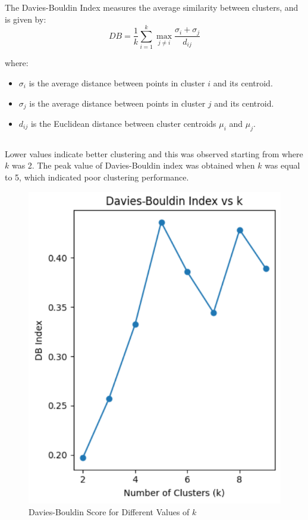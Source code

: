 \documentclass[conference]{IEEEtran}
\begin{document}
The Davies-Bouldin Index measures the average similarity between clusters, and is given by:
\begin{equation}
DB = \frac{1}{k} \sum_{i=1}^{k} \max_{j \neq i} \frac{\sigma_i + \sigma_j}{d_{ij}}
\end{equation}

where:
\begin{itemize}
    \item \( \sigma_i \) is the average distance between points in cluster \( i \) and its centroid.
    \item \( \sigma_j \) is the average distance between points in cluster \( j \) and its centroid.
    \item \( d_{ij} \) is the Euclidean distance between cluster centroids \( \mu_i \) and \( \mu_j \).
\end{itemize}

\[ \]

Lower values indicate better clustering and this was observed starting from
where \(k\) was 2. The peak value of Davies-Bouldin index was obtained when
\(k\) was equal to 5, which indicated poor clustering performance.
\begin{figure}[htbp]
    \centering
    \includegraphics[width=\columnwidth]{davies-bouldin_index.png}
    \caption{Davies-Bouldin Score for Different Values of \(k\)}
    \label{fig:example}
\end{figure}
\end{document}
